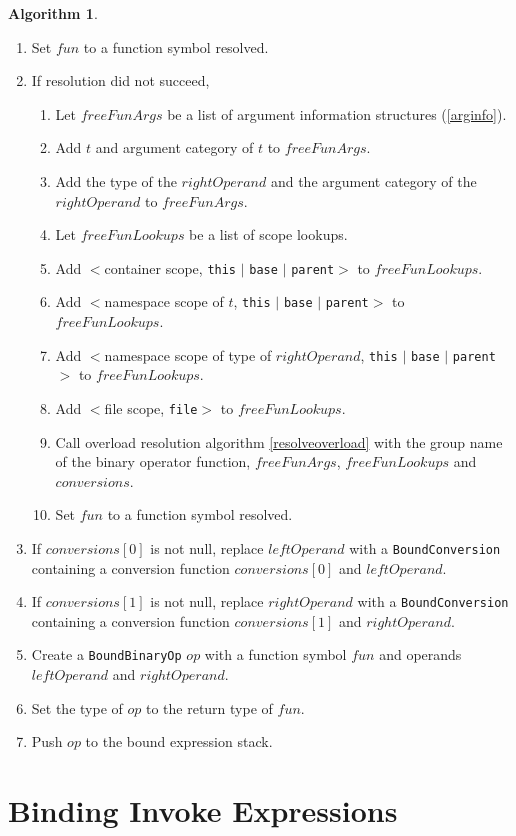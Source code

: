 \documentclass[a4paper,oneside,11pt]{book}
\theoremstyle{definition}
\newtheorem{algo}{Algorithm}[section]
\begin{document}
\begin{algo}
\begin{enumerate}
\item
Set $fun$ to a function symbol resolved.
\item
If resolution did not succeed,
\begin{enumerate}
\item
Let $freeFunArgs$ be a list of argument information structures (\ref{arginfo}).
\item
Add $t$ and argument category of $t$ to $freeFunArgs$.
\item
Add the type of the $rightOperand$ and the argument category of the $rightOperand$ to $freeFunArgs$.
\item
Let $freeFunLookups$ be a list of scope lookups.
\item
Add $<$container scope, \verb|this| $|$ \verb|base| $|$ \verb|parent|$>$ to $freeFunLookups$.
\item
Add $<$namespace scope of $t$, \verb|this| $|$ \verb|base| $|$ \verb|parent|$>$ to $freeFunLookups$.
\item
Add $<$namespace scope of type of $rightOperand$, \verb|this| $|$ \verb|base| $|$ \verb|parent|$>$ to $freeFunLookups$.
\item
Add $<$file scope, \verb|file|$>$ to $freeFunLookups$.
\item
Call overload resolution algorithm \ref{resolveoverload} with the group name of the binary operator function, $freeFunArgs$, $freeFunLookups$ and $conversions$.
\item
Set $fun$ to a function symbol resolved.
\end{enumerate}
\item
If $conversions[0]$ is not null, replace $leftOperand$ with a \verb|BoundConversion| containing a conversion function $conversions[0]$ and $leftOperand$.
\item
If $conversions[1]$ is not null, replace $rightOperand$ with a \verb|BoundConversion| containing a conversion function $conversions[1]$ and $rightOperand$.
\item
Create a \verb|BoundBinaryOp| $op$ with a function symbol $fun$ and operands $leftOperand$ and $rightOperand$.
\item
Set the type of $op$ to the return type of $fun$.
\item
Push $op$ to the bound expression stack.
\end{enumerate}
\end{algo}

\section{Binding Invoke Expressions}
\end{document}
